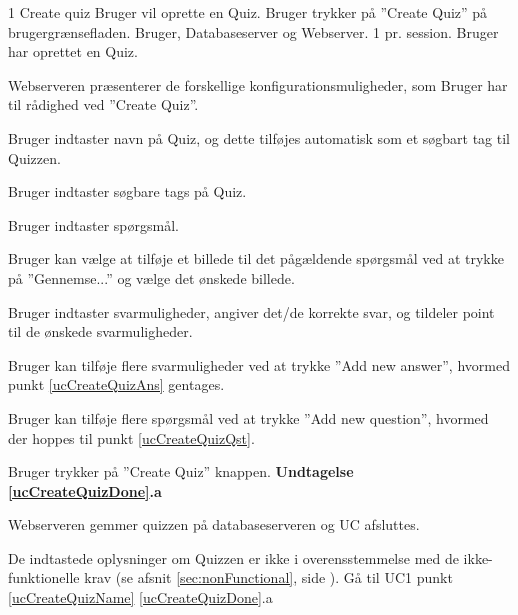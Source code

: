 
\uchead
	{1}
	{Create quiz}
	{Bruger vil oprette en Quiz.}
	{Bruger trykker på ''Create Quiz'' på brugergrænsefladen.}
	{Bruger, Databaseserver og Webserver.}
	{}
	{1 pr. session.}
	{Bruger har oprettet en Quiz.}

\item Webserveren præsenterer de forskellige konfigurationsmuligheder, som Bruger har til rådighed ved ''Create Quiz''.

\item \label{ucCreateQuizName} Bruger indtaster navn på Quiz, og dette tilføjes automatisk som et søgbart tag til Quizzen.

\item Bruger indtaster søgbare tags på Quiz.

\item \label{ucCreateQuizQst} Bruger indtaster spørgsmål.

\item Bruger kan vælge at tilføje et billede til det pågældende spørgsmål ved at trykke på ''Gennemse...'' og vælge det ønskede billede.

\item \label{ucCreateQuizAns} Bruger indtaster svarmuligheder, angiver det/de korrekte svar, og tildeler point til de ønskede svarmuligheder.

\item Bruger kan tilføje flere svarmuligheder ved at trykke ''Add new answer'', hvormed punkt \ref{ucCreateQuizAns} gentages.

\item Bruger kan tilføje flere spørgsmål ved at trykke ''Add new question'', hvormed der hoppes til punkt \ref{ucCreateQuizQst}.

\item \label{ucCreateQuizDone} Bruger trykker på ''Create Quiz'' knappen.
\textbf{Undtagelse \ref{ucCreateQuizDone}.a}

\item \label{ucCreateQuizDB} Webserveren gemmer quizzen på databaseserveren og UC afsluttes.

\ucdescriptionend

\ucextension
	{De indtastede oplysninger om Quizzen er ikke i overensstemmelse med de ikke-funktionelle krav (se afsnit \ref{sec:nonFunctional}, side \pageref{sec:nonFunctional}).}
	{Gå til UC1 punkt \ref{ucCreateQuizName}}
	{\ref{ucCreateQuizDone}.a}
		
